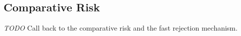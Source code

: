 \documentclass[conference]{IEEEtran}
\newcommand{\cm}[1]{\textit{{\color{blue}#1}}}
\begin{document}



   



\subsection{Comparative Risk}
\cm{TODO}
Call back to the comparative risk and the fast rejection mechanism. 
\end{document}
